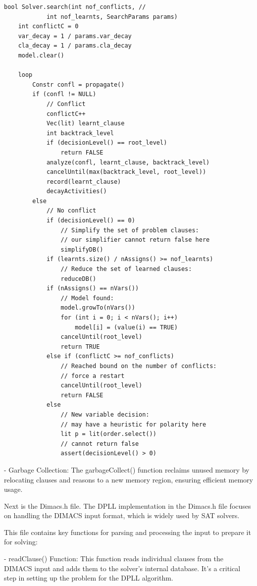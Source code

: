 \documentclass[runningheads]{llncs}
\begin{document}
\begin{lstlisting}
bool Solver.search(int nof_conflicts, //
            int nof_learnts, SearchParams params)
    int conflictC = 0
    var_decay = 1 / params.var_decay
    cla_decay = 1 / params.cla_decay
    model.clear()

    loop
        Constr confl = propagate()
        if (confl != NULL)
            // Conflict
            conflictC++
            Vec(lit) learnt_clause
            int backtrack_level
            if (decisionLevel() == root_level)
                return FALSE
            analyze(confl, learnt_clause, backtrack_level)
            cancelUntil(max(backtrack_level, root_level))
            record(learnt_clause)
            decayActivities()
        else
            // No conflict
            if (decisionLevel() == 0)
                // Simplify the set of problem clauses:
                // our simplifier cannot return false here
                simplifyDB()
            if (learnts.size() / nAssigns() >= nof_learnts)
                // Reduce the set of learned clauses:
                reduceDB()
            if (nAssigns() == nVars())
                // Model found:
                model.growTo(nVars())
                for (int i = 0; i < nVars(); i++)
                    model[i] = (value(i) == TRUE)
                cancelUntil(root_level)
                return TRUE
            else if (conflictC >= nof_conflicts)
                // Reached bound on the number of conflicts:
                // force a restart
                cancelUntil(root_level)
                return FALSE
            else
                // New variable decision:
                // may have a heuristic for polarity here
                lit p = lit(order.select()) 
                // cannot return false
                assert(decisionLevel() > 0) 
\end{lstlisting}

- Garbage Collection: The garbageCollect() function reclaims unused memory by relocating clauses and reasons to a new memory region, ensuring efficient memory usage.

Next is the Dimacs.h file.
The \ac{DPLL} implementation in the Dimacs.h file focuses on handling the DIMACS input format, which is widely used by \ac{SAT} solvers. 

This file contains key functions for parsing and processing the input to prepare it for solving:

- readClause() Function: This function reads individual clauses from the DIMACS input and adds them to the solver's internal database. It's a critical step in setting up the problem for the DPLL algorithm.
\end{document}
